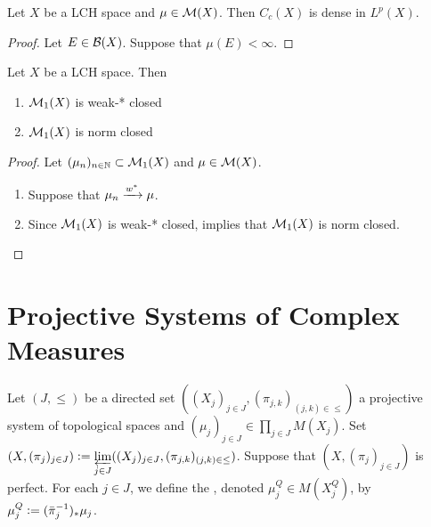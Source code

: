 \documentclass{book}
\begin{document}
	\begin{ex}
		Let $X$ be a LCH space and $\mu \in \mathcal{M}(X)$. Then $C_c(X)$ is dense in $L^p(X)$. 
	\end{ex}

	\begin{proof}
		Let $E \in \mathcal{B}(X)$. Suppose that $\mu(E) < \infty$. 
	\end{proof}

	\begin{ex}
		Let $X$ be a LCH space. Then 
		\begin{enumerate}
			\item $\mathcal{M}_1(X)$ is weak-* closed 
			\item $\mathcal{M}_1(X)$ is norm closed
		\end{enumerate} 
	\end{ex}

	\begin{proof} Let $(\mu_n)_{n \in \mathbb{N}} \subset \mathcal{M}_1(X)$ and $\mu \in \mathcal{M}(X)$. 
		\begin{enumerate}
			\item Suppose that $\mu_n \xrightarrow{w^*} \mu$.
			\item Since $\mathcal{M}_1(X)$ is weak-* closed,  implies that $\mathcal{M}_1(X)$ is norm closed.
		\end{enumerate}
	\end{proof}


































\newpage
\section{Projective Systems of Complex Measures}

\begin{defn}
	Let $(J, {\leq})$ be a directed set $((X_j)_{j \in J}, (\pi_{j,k})_{(j,k) \in \leq})$ a projective system of topological spaces and $(\mu_j)_{j \in J} \in \prod\limits_{j \in J} M(X_j)$. Set $(X, (\pi_j)_{j \in J}) \vcentcolon= \varprojlim\limits_{j \in J} ((X_j)_{j \in J}, (\pi_{j,k})_{(j,k) \in \leq})$. Suppose that $(X, (\pi_j)_{j \in J})$ is perfect. For each $j \in J$, we define the , denoted $\mu^Q_j \in M(X^Q_j)$, by $\mu^Q_j \vcentcolon= (\bar{\pi}_j^{-1})_*\mu_j$. 
\end{defn}
\end{document}
